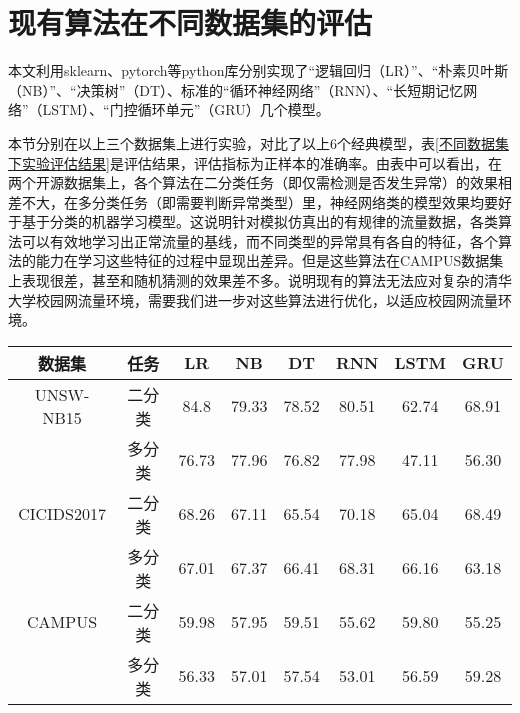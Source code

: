 \section{现有算法在不同数据集的评估}
本文利用sklearn、pytorch等python库分别实现了“逻辑回归（LR）”、“朴素贝叶斯（NB）”、“决策树”（DT）、标准的“循环神经网络”（RNN）、“长短期记忆网络”（LSTM）、“门控循环单元”（GRU）几个模型。

本节分别在以上三个数据集上进行实验，对比了以上6个经典模型，表\ref{不同数据集下实验评估结果}是评估结果，评估指标为正样本的准确率。由表中可以看出，在两个开源数据集上，各个算法在二分类任务（即仅需检测是否发生异常）的效果相差不大，在多分类任务（即需要判断异常类型）里，神经网络类的模型效果均要好于基于分类的机器学习模型。这说明针对模拟仿真出的有规律的流量数据，各类算法可以有效地学习出正常流量的基线，而不同类型的异常具有各自的特征，各个算法的能力在学习这些特征的过程中显现出差异。但是这些算法在CAMPUS数据集上表现很差，甚至和随机猜测的效果差不多。说明现有的算法无法应对复杂的清华大学校园网流量环境，需要我们进一步对这些算法进行优化，以适应校园网流量环境。




\begin{table*}[t]
    \small
    \caption{不同数据集下实验评估结果}
    \label{不同数据集下实验评估结果}
    \centering
    \begin{tabular}{c|c|ccc|ccc}
    \toprule
    
     数据集 &  任务  &  
     LR &  NB & DT & RNN & LSTM & GRU  \\
    \midrule
    
    UNSW-NB15 & 二分类 & 84.8 & 79.33 & 78.52 &  80.51 & 62.74 & 68.91  \\ 
    
    & 多分类 &76.73 & 77.96 & 76.82 & 77.98 & 47.11 & 56.30  \\
    
    \midrule
    CICIDS2017 & 二分类 & 68.26 & 67.11 & 65.54 & 70.18 & 65.04 & 68.49  \\
    & 多分类 & 67.01 & 67.37 & 66.41 & 68.31 & 66.16 & 63.18 \\
    \midrule
    CAMPUS & 二分类 & 59.98 & 57.95 & 59.51 & 55.62 & 59.80 & 55.25 \\
    & 多分类 & 56.33 & 57.01 & 57.54 & 53.01 & 56.59 & 59.28 \\
   
     \bottomrule
    
    \end{tabular}
    \end{table*}
